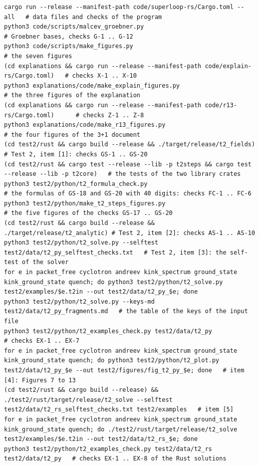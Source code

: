 \documentclass[
  10pt,
]{article}
\begin{document}
\begin{verbatim}
cargo run --release --manifest-path code/superloop-rs/Cargo.toml -- all   # data files and checks of the program
python3 code/scripts/malcev_groebner.py                                  # Groebner bases, checks G-1 .. G-12
python3 code/scripts/make_figures.py                                     # the seven figures
(cd explanations && cargo run --release --manifest-path code/explain-rs/Cargo.toml)   # checks X-1 .. X-10
python3 explanations/code/make_explain_figures.py                        # the three figures of the explanation
(cd explanations && cargo run --release --manifest-path code/r13-rs/Cargo.toml)      # checks Z-1 .. Z-8
python3 explanations/code/make_r13_figures.py                            # the four figures of the 3+1 document
(cd test2/rust && cargo build --release && ./target/release/t2_fields)   # Test 2, item [1]: checks GS-1 .. GS-20
(cd test2/rust && cargo test --release --lib -p t2steps && cargo test --release --lib -p t2core)   # the tests of the two library crates
python3 test2/python/t2_formula_check.py                                 # the formulas of GS-18 and GS-20 with 40 digits: checks FC-1 .. FC-6
python3 test2/python/make_t2_steps_figures.py                            # the five figures of the checks GS-17 .. GS-20
(cd test2/rust && cargo build --release && ./target/release/t2_analytic) # Test 2, item [2]: checks AS-1 .. AS-10
python3 test2/python/t2_solve.py --selftest test2/data/t2_py_selftest_checks.txt   # Test 2, item [3]: the self-test of the solver
for e in packet_free cyclotron andreev kink_spectrum ground_state kink_ground_state quench; do python3 test2/python/t2_solve.py test2/examples/$e.t2in --out test2/data/t2_py_$e; done
python3 test2/python/t2_solve.py --keys-md test2/data/t2_py_fragments.md   # the table of the keys of the input file
python3 test2/python/t2_examples_check.py test2/data/t2_py                   # checks EX-1 .. EX-7
for e in packet_free cyclotron andreev kink_spectrum ground_state kink_ground_state quench; do python3 test2/python/t2_plot.py test2/data/t2_py_$e --out test2/figures/fig_t2_py_$e; done   # item [4]: Figures 7 to 13
(cd test2/rust && cargo build --release) && ./test2/rust/target/release/t2_solve --selftest test2/data/t2_rs_selftest_checks.txt test2/examples   # item [5]
for e in packet_free cyclotron andreev kink_spectrum ground_state kink_ground_state quench; do ./test2/rust/target/release/t2_solve test2/examples/$e.t2in --out test2/data/t2_rs_$e; done
python3 test2/python/t2_examples_check.py test2/data/t2_rs test2/data/t2_py   # checks EX-1 .. EX-8 of the Rust solutions

\end{verbatim}
\end{document}
